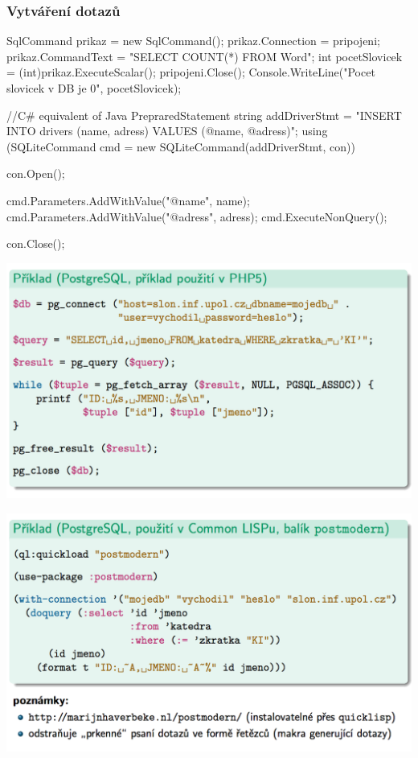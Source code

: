 \documentclass[10pt,a4paper]{article}
\begin{document}
\subsubsection{Vytváření dotazů}
\begin{CS}
SqlCommand prikaz = new SqlCommand();
prikaz.Connection = pripojeni;
prikaz.CommandText = "SELECT COUNT(*) FROM Word";
int pocetSlovicek = (int)prikaz.ExecuteScalar(); 
pripojeni.Close();
Console.WriteLine("Pocet slovicek v DB je {0}", pocetSlovicek);

//C# equivalent of Java PrepraredStatement
string addDriverStmt = "INSERT INTO drivers (name, adress) VALUES (@name, @adress)";
using (SQLiteCommand cmd = new SQLiteCommand(addDriverStmt, con))
{
  con.Open();

  cmd.Parameters.AddWithValue("@name", name);
  cmd.Parameters.AddWithValue("@adress", adress);
  cmd.ExecuteNonQuery();
}
con.Close();
\end{CS}

\includegraphics[scale=0.4]{img/80}

\includegraphics[scale=0.4]{img/81}
\end{document}

